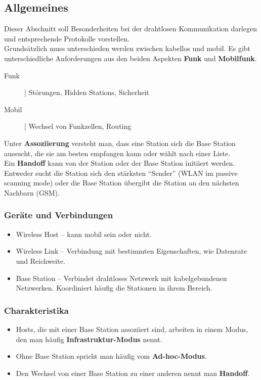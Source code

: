 \documentclass{article} %
\begin{document}
\subsection{Allgemeines}
Dieser Abschnitt soll Besonderheiten bei der drahtlosen Kommunikation darlegen und entsprechende Protokolle vorstellen.\\
Grundsätzlich muss unterschieden werden zwischen kabellos und mobil. Es gibt unterschiedliche Anforderungen aus den beiden Aspekten \textbf{Funk} und \textbf{Mobilfunk}.
	\begin{description}
	\item [Funk] | Störungen, Hidden Stations, Sicherheit 
	\item [Mobil] | Wechsel von Funkzellen, Routing 
	\end{description}
Unter \textbf{Assoziierung} versteht man, dass eine Station sich die Base Station aussucht, die sie am besten empfangen kann oder wählt nach einer Liste. \\
Ein \textbf{Handoff} kann von der Station oder der Base Station initiiert werden. Entweder sucht die Station sich den stärksten "`Sender"' (WLAN im passive scanning mode) oder die Base Station übergibt die Station an den nächsten Nachbarn (GSM).


	
\subsubsection{Geräte und Verbindungen}
	\begin{itemize}
	\item Wireless Host – kann mobil sein oder nicht.  
	\item Wireless Link – Verbindung mit bestimmten Eigenschaften, wie Datenrate und Reichweite.  
	\item Base Station – Verbindet drahtloses Netzwerk mit kabelgebundenen Netzwerken. Koordiniert häufig die Stationen in ihrem Bereich. 
	\end{itemize}	
\subsubsection{Charakteristika}
	\begin{itemize}
	\item Hosts, die mit einer Base Station assoziiert sind, arbeiten in einem Modus, den man häufig \textbf{Infrastruktur-Modus} nennt.
	\item Ohne Base Station spricht man häufig vom \textbf{Ad-hoc-Modus}. 
	\item Den Wechsel von einer Base Station zu einer anderen nennt man \textbf{Handoff}.
	\end{itemize}
	
\end{document}

